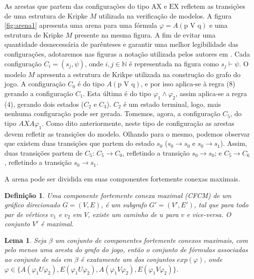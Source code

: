 \documentclass[normaltoc,capchap,capsec,times]{abnt}
\newtheorem{defi}{Definição}[section]
\newtheorem{lemma}{Lema}[section]
\begin{document}
As arestas que partem das configurações do tipo $\mbox{AX e EX}$ refletem as transições de uma estrutura de Kripke $M$ utilizada na verificação de modelos. A figura \ref{fig:arena1} apresenta uma arena para uma fórmula $\varphi=A(\mbox{p V q})$ e uma estrutura de Kripke $M$ presente na mesma figura. A fim de evitar uma quantidade desnecessária de parênteses e garantir uma melhor legibilidade das configurações, adotaremos nas figuras a notação utilizada pelos autores em \cite{aline}. Cada configuração $C_i = (s_j,\psi)$, onde $i,j \in \mathbb{N}$ é representada na figura como $s_j \vdash \psi$.
O modelo $M$ apresenta a estrutura de Krikpe utilizada na construção do grafo do jogo. A configuração $C_0$ é do tipo $A(\mbox{p V q})$, e por isso aplica-se à regra (8) gerando a configuração $C_1$. Esta última é do tipo $\varphi_1 \wedge \varphi_2$, assim aplica-se a regra (4), gerando dois estados ($C_2$ e $C_3$). $C_2$ é um estado terminal, logo, mais nenhuma configuração pode ser gerada. Tomemos, agora, a configuração $C_5$, do tipo $AX A \varphi_1$. Como dito anteriormente, neste tipo de configuração as arestas devem refletir as transições do modelo. Olhando para o mesmo, podemos observar que existem duas transições que partem do estado $s_0$ ($s_0 \to s_0$ e $s_0 \to s_1$). Assim, duas transições partem de $C_5$: $C_5 \to C_0$, refletindo a transição $s_0 \to s_0$; e $C_5 \to C_6$, refletindo a transição $s_0 \to s_1$. %


A arena pode ser dividida em suas componentes fortemente conexas maximais. 


\begin{defi}\label{def:CFCM}
\textnormal{
Uma componente fortemente conexa maximal (CFCM) de um gráfico direcionado $G = (V,E)$, é um  subgrafo $G' = (V',E')$, tal que para todo par de vértices $v_1$ e $v_2$ em $V$, existe um caminho de $u$ para $v$ e vice-versa. O conjunto $V'$ é maximal.
}
\end{defi}

\begin{lemma}\label{lem:CFC}
\textnormal{
\cite{grumbergalg} Seja $\beta$ um conjunto de componentes fortemente conexos maximais, com pelo menos uma aresta do grafo do jogo, então o conjunto de fórmulas associadas ao conjunto de nós em $\beta$ é exatamente um dos conjuntos $exp(\varphi)$, onde $\varphi\in \{ A(\varphi_1 U \varphi_2), E(\varphi_1 U \varphi_2), A(\varphi_1 V \varphi_2), E(\varphi_1 V \varphi_2)\}$.
}
\end{lemma}
\end{document}

